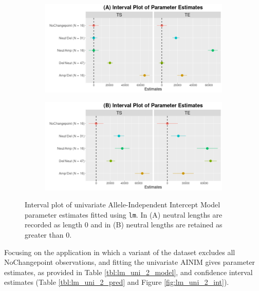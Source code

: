 \begin{figure}[H]
\vspace{0.5cm}
     \begin{subfigure}[t]{.49\textwidth}
      \centering
      \includegraphics[width = 1\textwidth]{../figures/Chapter_5/Univariate_lm_7_AI_Interval.png}
    \end{subfigure}%
     \begin{subfigure}[t]{.49\textwidth}
      \centering
       \includegraphics[width = 1\textwidth]{../figures/Chapter_5/Univariate_lm_7_Neut_AI_Interval.png}
    \end{subfigure} 
     \caption[Interval plot of univariate Allele-Independent Intercept Model parameter estimates fitted using \texttt{lm()}.]{Interval plot of univariate Allele-Independent Intercept Model parameter estimates fitted using \texttt{lm}. In (A) neutral lengths are recorded as length 0 and in (B) neutral lengths are retained as greater than 0.}
     \label{fig:lm_uni_1_int}
\end{figure}

Focusing on the application in which a variant of the dataset excludes all NoChangepoint observations, and fitting the univariate AINIM gives parameter estimates, as provided in Table \ref{tbl:lm_uni_2_model}, and confidence interval estimates (Table \ref{tbl:lm_uni_2_pred} and Figure  \ref{fig:lm_uni_2_int}).

